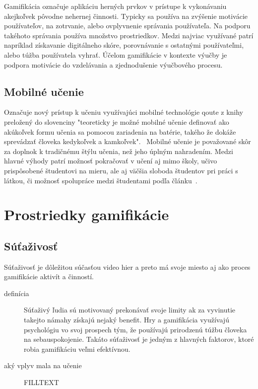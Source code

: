 \documentclass[10pt,slovak,a4paper]{article}
\begin{document}
Gamifikácia označuje aplikáciu herných prvkov v prístupe k vykonávaniu akejkoľvek pôvodne nehernej činnosti. Typicky sa používa na zvýšenie motivácie používateľov, na zotrvanie, alebo ovplyvnenie správania používateľa. Na podporu takéhoto správania používa množstvo prostriedkov. Medzi najviac využívané patrí napríklad získavanie digitálneho skóre, porovnávanie s ostatnými používateľmi, alebo túžba používatela vyhrať. Účelom gamifikácie v kontexte výučby je podpora motivácie do vzdelávania a zjednodušenie výučbového procesu. 


\subsection{Mobilné učenie} \label{mobilelearning}

Označuje nový prístup k učeniu využívajúci mobilné technológie qoute z knihy preložený do slovenciny "teoreticky je možné mobilné učenie definovať ako akúkoľvek formu učenia sa pomocou zariadenia na batérie, takého že dokáže sprevádzať človeka kedykoľvek a kamkoľvek".~\cite{deMoraesSarmentoRego2015}
Mobilné učenie je považované skôr za doplnok k tradičnému štýlu učenia, než jeho úplným nahradením. Medzi hlavné výhody patrí možnosť pokračovať v učení aj mimo školy, učivo prispôsobené študentovi na mieru, ale aj väčšia sloboda študentov pri práci s látkou, či možnosť spolupráce medzi študentami podľa článku~\cite{deMoraesSarmentoRego2015}.


\section{Prostriedky gamifikácie}

\subsection{Súťaživosť} \label{competitiveness}
Súťaživosť je dôležitou súčasťou video hier a preto má svoje miesto aj ako proces gamifikácie aktivít a činností.
\begin{description}
\item [definícia]
Súťaživý ľudia sú motivovaný prekonávať svoje limity ak za vyvinutie takejto námahy získajú nejaký benefit. Hry a gamifikácia využívajú psychológiu vo svoj prospech tým, že používajú prirodzenú túžbu človeka na sebauspokojenie. Takáto súťaživosť je jedným z hlavných faktorov, ktoré robia gamifikáciu veľmi efektívnou.

\item [aký vplyv mala na učenie] FILLTEXT
\end{description}
\end{document}

